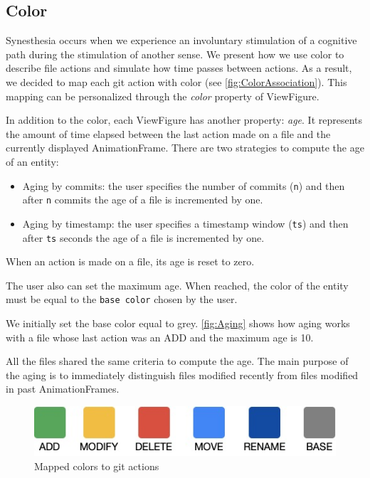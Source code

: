 \subsection*{Color}

Synesthesia occurs when we experience an involuntary stimulation of a cognitive path during the stimulation of another sense.
We present how we use color to describe file actions and simulate how time passes between actions.
As a result, we decided to map each git action with color (see \autoref{fig:ColorAssociation}). This mapping can be personalized through the \textit{color} property of ViewFigure.

In addition to the color, each ViewFigure has another property: \textit{age}. It represents the amount of time elapsed between the last action made on a file and the currently displayed AnimationFrame. 
There are two strategies to compute the age of an entity:

\begin{itemize}
    \item{Aging by commits}: the user specifies the number of commits (\texttt{n}) and then after \texttt{n} commits the age of a file is incremented by one. 
    \item{Aging by timestamp}:  the user specifies a timestamp window (\texttt{ts}) and then after \texttt{ts} seconds the age of a file is incremented by one.
\end{itemize}

When an action is made on a file, its age is reset to zero. 

The user also can set the maximum age.
When reached, the color of the entity must be equal to the \texttt{base color} chosen by the user.
 
We initially set the base color equal to grey. \autoref{fig:Aging} shows how aging works with a file whose last action was an ADD and the maximum age is 10. 

All the files shared the same criteria to compute the age. The main purpose of the aging is to immediately distinguish files modified recently from files modified in past AnimationFrames.

\begin{figure}
    \center
    \includegraphics[width=0.\textwidth]{ColorMapping.jpg}
    \caption{Mapped colors to git actions}
    \label{fig:ColorAssociation}
\end{figure}


